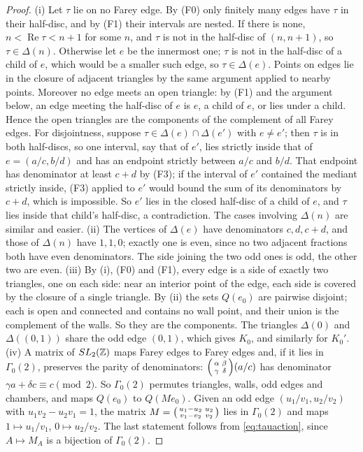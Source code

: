 \begin{proof}
(i) Let $\tau$ lie on no Farey edge. By (F0) only finitely many edges have $\tau$ in their half-disc, and by (F1) their intervals are nested. If there is none, $n<\operatorname{Re}\tau<n+1$ for some $n$, and $\tau$ is not in the half-disc of $(n,n+1)$, so $\tau\in\Delta(n)$. Otherwise let $e$ be the innermost one; $\tau$ is not in the half-disc of a child of $e$, which would be a smaller such edge, so $\tau\in\Delta(e)$. Points on edges lie in the closure of adjacent triangles by the same argument applied to nearby points. Moreover no edge meets an open triangle: by (F1) and the argument below, an edge meeting the half-disc of $e$ is $e$, a child of $e$, or lies under a child. Hence the open triangles are the components of the complement of all Farey edges. For disjointness, suppose $\tau\in\Delta(e)\cap\Delta(e')$ with $e\ne e'$; then $\tau$ is in both half-discs, so one interval, say that of $e'$, lies strictly inside that of $e=(a/c,b/d)$ and has an endpoint strictly between $a/c$ and $b/d$. That endpoint has denominator at least $c+d$ by (F3); if the interval of $e'$ contained the mediant strictly inside, (F3) applied to $e'$ would bound the sum of its denominators by $c+d$, which is impossible. So $e'$ lies in the closed half-disc of a child of $e$, and $\tau$ lies inside that child's half-disc, a contradiction. The cases involving $\Delta(n)$ are similar and easier.
(ii) The vertices of $\Delta(e)$ have denominators $c,d,c+d$, and those of $\Delta(n)$ have $1,1,0$; exactly one is even, since no two adjacent fractions both have even denominators. The side joining the two odd ones is odd, the other two are even.
(iii) By (i), (F0) and (F1), every edge is a side of exactly two triangles, one on each side: near an interior point of the edge, each side is covered by the closure of a single triangle. By (ii) the sets $Q(e_0)$ are pairwise disjoint; each is open and connected and contains no wall point, and their union is the complement of the walls. So they are the components. The triangles $\Delta(0)$ and $\Delta((0,1))$ share the odd edge $(0,1)$, which gives $K_0$, and similarly for $K_0'$.
(iv) A matrix of $SL_2(\mathbb{Z})$ maps Farey edges to Farey edges and, if it lies in $\Gamma_0(2)$, preserves the parity of denominators: $\begin{psmallmatrix}\alpha&\beta\\\gamma&\delta\end{psmallmatrix}(a/c)$ has denominator $\gamma a+\delta c\equiv c\pmod2$. So $\Gamma_0(2)$ permutes triangles, walls, odd edges and chambers, and maps $Q(e_0)$ to $Q(Me_0)$. Given an odd edge $(u_1/v_1,u_2/v_2)$ with $u_1v_2-u_2v_1=1$, the matrix $M=\begin{psmallmatrix}u_1-u_2&u_2\\v_1-v_2&v_2\end{psmallmatrix}$ lies in $\Gamma_0(2)$ and maps $1\mapsto u_1/v_1$, $0\mapsto u_2/v_2$. The last statement follows from \eqref{eq:tauaction}, since $A\mapsto M_A$ is a bijection of $\Gamma_0(2)$.
\end{proof}

